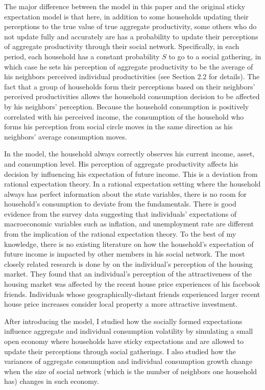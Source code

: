 \documentclass[12pt,letterpaper]{article}
\begin{document}
The major difference between the model in this paper and the original sticky expectation model is that here, in addition to some households updating their perceptions to the true value of true aggregate productivity, some others who do not update fully and accurately are has a probability to update their perceptions of aggregate productivity through their social network. Specifically, in each period, each household has a constant probability $S$ to go to a social gathering, in which case he sets his perception of aggregate productivity to be the average of his neighbors perceived individual productivities (see Section 2.2 for details). The fact that a group of households form their perceptions based on their neighbors' perceived productivities allows the household consumption decision to be affected by his neighbors' perception. Because the household consumption is positively correlated with his perceived income, the consumption of the household who forms his perception from social circle moves in the same direction as his neighbors' average consumption moves.\par
In the model, the household always correctly observes his current income, asset, and consumption level. His perception of aggregate productivity affects his decision by influencing his expectation of future income. This is a deviation from rational expectation theory. In a rational expectation setting where the household always has perfect information about the state variables, there is no room for household's consumption to deviate from the fundamentals. There is good evidence from the survey data suggesting that individuals' expectations of macroeconomic variables such as inflation, and unemployment rate are different from the implication of the rational expectation theory. \cite[]{InflationEvid}\cite[]{SurveyData}
To the best of my knowledge, there is no existing literature on how the household's expectation of future income is impacted by other members in his social network. The most closely related research is done by \cite{Facebook} on the individual's perception of the housing market. They found that an individual's perception of the attractiveness of the housing market was affected by the recent house price experiences of his facebook friends. Individuals whose geographically-distant friends experienced larger recent house price increases consider local property a more attractive investment.
\par
After introducing the model, I studied how the socially formed expectations influence aggregate and individual consumption volatility by simulating a small open economy where households have sticky expectations and are allowed to update their perceptions through social gatherings. I also studied how the variances of aggregate consumption and individual consumption growth change when the size of social network (which is the number of neighbors one household has) changes in such economy.\par
\end{document}
